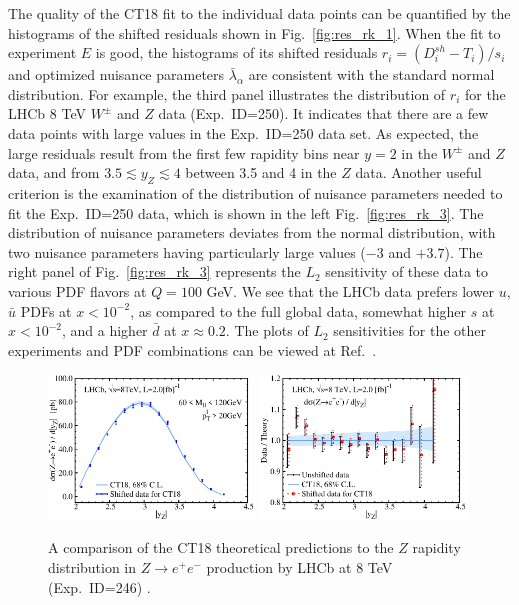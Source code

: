 The quality of the CT18 fit to the individual data points can be quantified by the histograms of the shifted residuals
shown in Fig.~\ref{fig:res_rk_1}. When the fit to experiment $E$ is good, the histograms of its shifted residuals $r_i\! =\! (D^\mathit{sh}_{i}-T_{i})/s_{i}$  and optimized nuisance parameters $\bar\lambda_\alpha$ are consistent with the standard normal distribution. For example, the third panel  illustrates the distribution of $r_i$ for
the LHCb 8 TeV $W^\pm$ and $Z$ data (Exp.~ID=250). It indicates that there are 
a few data points with large values in the Exp.~ID=250 data set. As expected, the large residuals result from the first 
few rapidity bins near $y=2$ in the $W^\pm$ and $Z$ data, and from $3.5\lesssim y_Z\lesssim 4$ between 3.5 and 4 in the $Z$ data.
%
%
Another useful criterion is the examination of the distribution of nuisance parameters needed 
to fit the Exp.~ID=250 data, which is shown in the left Fig.~\ref{fig:res_rk_3}. The distribution of nuisance parameters deviates from the normal distribution, with two nuisance parameters having particularly large values ($-3$ and $+3.7$).
The right panel of Fig.~\ref{fig:res_rk_3} represents 
the $L_2$ sensitivity of these data to various PDF flavors at $Q=100$ GeV. We see that the LHCb data prefers lower $u$, $\bar u$ PDFs at $x<10^{-2}$, as compared to the full global data, somewhat higher $s$ at $x < 10^{-2}$, and a higher $\bar d$ at $x\approx 0.2$. The plots of $L_2$ sensitivities for the other experiments and PDF combinations can be viewed at Ref.~\cite{CT18L2Sensitivity}.

\begin{figure}[p]
\includegraphics[width=0.49\textwidth]{./fig/fig2/data_246_CT18_abs_ect.pdf}
\includegraphics[width=0.49\textwidth]{./fig/fig2/data_246_CT18_DoT_ect.pdf}
\caption{A comparison of the CT18 theoretical predictions to the $Z$ rapidity distribution in $Z\to e^+e^-$ production by LHCb at 8 TeV (Exp.~ID=246) .
}
\label{fig:LHCb8Zee}
 \end{figure}

